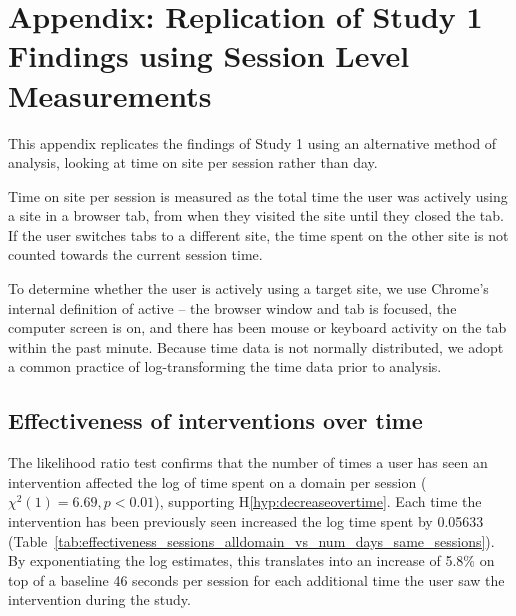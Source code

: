 \pagebreak

\section{Appendix: Replication of Study 1 Findings using Session Level Measurements}


This appendix replicates the findings of Study 1 using an alternative method of analysis, looking at time on site per session rather than day.

Time on site per session is measured as the total time the user was actively using a site in a browser tab, from when they visited the site until they closed the tab. If the user switches tabs to a different site, the time spent on the other site is not counted towards the current session time.

To determine whether the user is actively using a target site, we use Chrome's internal definition of active -- the browser window and tab is focused, the computer screen is on, and there has been mouse or keyboard activity on the tab within the past minute. 
Because time data is not normally distributed, we adopt a common practice of log-transforming the time data prior to analysis.


\subsection{Effectiveness of interventions over time}

The likelihood ratio test confirms that the number of times a user has seen an intervention affected the log of time spent on a domain per session ($\chi^{2}(1) = 6.69, p < 0.01$), supporting H\ref*{hyp:decreaseovertime}. Each time the intervention has been previously seen increased the log time spent by 0.05633 (Table~\ref{tab:effectiveness_sessions_alldomain_vs_num_days_same_sessions}). By exponentiating the log estimates, this translates into an increase of 5.8\% on top of a baseline 46 seconds per session for each additional time the user saw the intervention during the study. %


